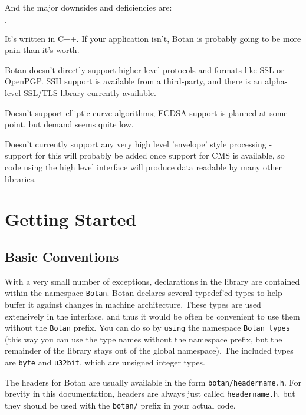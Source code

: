 \documentclass{article}
\newcommand{\filename}[1]{\texttt{#1}}
\newcommand{\keyword}[1]{\texttt{#1}}
\newcommand{\type}[1]{\texttt{#1}}
\newcommand{\namespace}[1]{\texttt{#1}}
\begin{document}
\noindent
And the major downsides and deficiencies are:

\begin{list}{$\cdot$}
  \item It's written in C++. If your application isn't, Botan is probably
        going to be more pain than it's worth.
  \item

  \item Botan doesn't directly support higher-level protocols and
        formats like SSL or OpenPGP. SSH support is available from a
        third-party, and there is an alpha-level SSL/TLS library
        currently available.

  \item Doesn't support elliptic curve algorithms; ECDSA support is planned at
        some point, but demand seems quite low.

  \item Doesn't currently support any very high level 'envelope' style
        processing - support for this will probably be added once support for
        CMS is available, so code using the high level interface will produce
        data readable by many other libraries.
\end{list}

\pagebreak
\section{Getting Started}

\subsection{Basic Conventions}

With a very small number of exceptions, declarations in the library
are contained within the namespace \namespace{Botan}. Botan declares
several typedef'ed types to help buffer it against changes in machine
architecture.  These types are used extensively in the interface, and
thus it would be often be convenient to use them without the
\namespace{Botan} prefix. You can do so by \keyword{using} the
namespace \namespace{Botan\_types} (this way you can use the type
names without the namespace prefix, but the remainder of the library
stays out of the global namespace). The included types are \type{byte}
and \type{u32bit}, which are unsigned integer types.

The headers for Botan are usually available in the form
\filename{botan/headername.h}. For brevity in this documentation,
headers are always just called \filename{headername.h}, but they
should be used with the \filename{botan/} prefix in your actual code.
\end{document}
